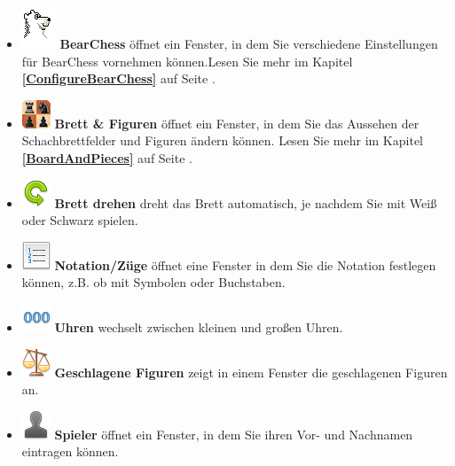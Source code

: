 \documentclass[11pt,a4paper]{article}
\begin{document}
	\begin{itemize}
		\item  \includegraphics[scale=0.6]{BearChessIcon.png} \textbf{BearChess} öffnet ein Fenster, in dem Sie verschiedene Einstellungen für BearChess vornehmen können.Lesen Sie mehr im Kapitel \textbf{\ref{ConfigureBearChess}  } auf Seite \pageref{ConfigureBearChess}.
		\item  \includegraphics[scale=0.9]{Board2DPieces32.png} \textbf{Brett \& Figuren} öffnet ein Fenster, in dem Sie das Aussehen der Schachbrettfelder und Figuren ändern können.  Lesen Sie mehr im Kapitel \textbf{\ref{BoardAndPieces}  } auf Seite \pageref{BoardAndPieces}.
		\item \includegraphics[scale=0.5]{arrow_rotate_anticlockwise.png}  \textbf{Brett drehen} dreht das Brett automatisch, je nachdem Sie mit Weiß oder Schwarz spielen.
		\item  \includegraphics[scale=0.5]{text_list_numbers.png} \textbf{Notation/Züge} öffnet eine Fenster in dem Sie die Notation festlegen können, z.B. ob mit Symbolen oder Buchstaben.
		\item  \includegraphics[scale=0.5]{digit_separator.png}  \textbf{Uhren} wechselt zwischen kleinen und großen Uhren.
		\item  \includegraphics[scale=0.5]{balance_unbalance.png}  \textbf{Geschlagene Figuren} zeigt in einem Fenster die geschlagenen Figuren an.
		\item  \includegraphics[scale=0.5]{user_silhouette.png}  \textbf{Spieler} öffnet ein Fenster, in dem Sie ihren Vor- und Nachnamen eintragen können.	

\end{itemize}
\end{document}

